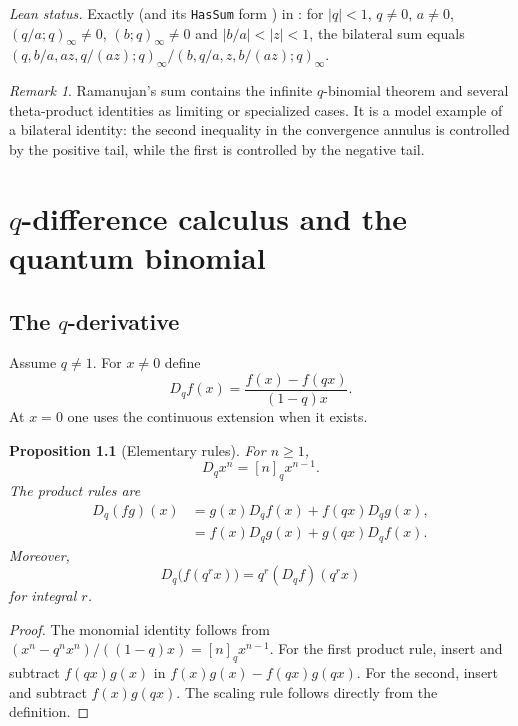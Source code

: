 \documentclass[11pt,a4paper,oneside,openany]{book}
\newtheorem{proposition}[proposition]{Proposition}
\theoremstyle{definition}
\theoremstyle{remark}
\newtheorem{remark}[remark]{Remark}
\begin{document}
\emph{Lean status.}  Exactly  (and its \texttt{HasSum} form
) in : for $|q|<1$, $q\ne0$,
$a\ne0$, $(q/a;q)_\infty\ne0$, $(b;q)_\infty\ne0$ and $|b/a|<|z|<1$, the bilateral sum
equals $(q,b/a,az,q/(az);q)_\infty/(b,q/a,z,b/(az);q)_\infty$.


\begin{remark}
Ramanujan's sum contains the infinite $q$-binomial theorem and several theta-product identities as limiting or specialized cases.  It is a model example of a bilateral identity: the second inequality in the convergence annulus is controlled by the positive tail, while the first is controlled by the negative tail.
\end{remark}


\chapter{\texorpdfstring{$q$}{q}-difference calculus and the quantum binomial}\label{chap:qcalculus}

\section{The \texorpdfstring{$q$}{q}-derivative}

Assume $q\ne1$.  For $x\ne0$ define
\[
 D_qf(x)=\frac{f(x)-f(qx)}{(1-q)x}.
\]
At $x=0$ one uses the continuous extension when it exists.

\begin{proposition}[Elementary rules]\label{prop:qderivative-rules}
For $n\ge1$,
\[
 D_qx^n=[n]_qx^{n-1}.
\]
The product rules are
\begin{align*}
 D_q(fg)(x)&=g(x)D_qf(x)+f(qx)D_qg(x),\\
 &=f(x)D_qg(x)+g(qx)D_qf(x).
\end{align*}
Moreover,
\[
 D_q\bigl(f(q^rx)\bigr)=q^r(D_qf)(q^rx)
\]
for integral $r$.
\end{proposition}

\begin{proof}
The monomial identity follows from
\(
 (x^n-q^nx^n)/((1-q)x)=[n]_qx^{n-1}.
\)
For the first product rule, insert and subtract $f(qx)g(x)$ in
\(
 f(x)g(x)-f(qx)g(qx).
\)
For the second, insert and subtract $f(x)g(qx)$.  The scaling rule follows directly from the definition.
\end{proof}
\end{document}
